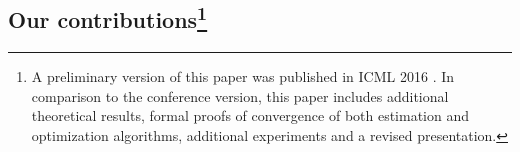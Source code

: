 % 

%
%

\subsection*{Our contributions\footnote{A preliminary version of this paper was published in ICML 2016 \cite{la2016cumulative}. In comparison to the conference version, this paper includes additional theoretical results, formal proofs of convergence of both estimation and optimization algorithms, additional experiments and a revised presentation.}}

